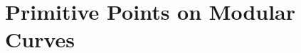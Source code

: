\documentclass[11pt,reqno]{amsart}
\theoremstyle{plain}
\theoremstyle{definition}
\newcommand{\Q}{\bQ}
\newcommand{\PP}{\mathbf P}
\newcommand{\filip}[1]{{\textcolor{cyan}{Filip: [#1]}}}
\newcommand{\abbey}[1]{\textcolor{blue}{Abbey: #1}}
\begin{document}
\begin{comment}
\filip{Work in progress. If we prove $\deg q=d$, we are done. There's a more general question here, which I think is interesting: given a morphism $f:X\rightarrow \PP^1$ over $\Q$, with genus of $X$ at least 2, is it possible that there's infinitely many points of degree $<d$ in $f^{-1}(\PP^1(\Q))$. For $d=2$, the answer is no, and I think this might be the case in general. If anyone knows of a reference (or proof) of this, let me know; this would complete the proof of this lemma. } \abbey{Seems like you'd want some sort of strong form of Hilbert's irreducibility for this? I hadn't thought of this before... I believe there are infinitely many $c\in\Q$ such that $f-c$ is irreducible, which gives infinitely many degree $d$ points. So you want to know whether there are only finitely many $c$ such that $f-c$ is reducible? It looks like in some cases something like this is true (e.g., ``Finiteness results for Hilbert's irreducibility theorem" by M\"{u}ller), but not in general.}
\filip{Yes, this would be some strong form of Hilbert's irreducibility. Is there a single example, of an $X$ of genus $\geq 2$ and $f$, where $f$ does not factor as $f=f_1\circ f_2$  with $\deg f_i>1$ (otherwise there can be many counterexamples), where this is not true?}
\end{comment}





\section{Primitive Points on Modular Curves}
\label{sec:PrimitivePoints}
\end{document}
